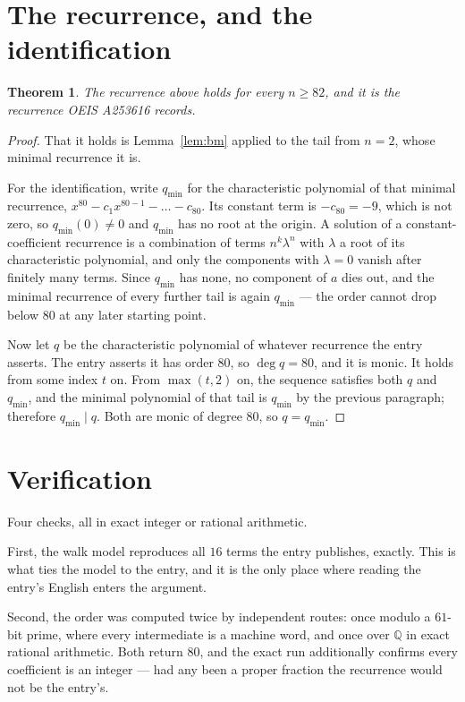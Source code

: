 \documentclass[11pt,a4paper]{article}
\theoremstyle{plain}
\newtheorem{theorem}{Theorem}
\theoremstyle{definition}
\begin{document}
\section{The recurrence, and the identification}

\begin{theorem}
The recurrence above holds for every $n\ge82$, and it is the recurrence OEIS A253616 records.
\end{theorem}

\begin{proof}
That it holds is Lemma~\ref{lem:bm} applied to the tail from $n=2$, whose minimal
recurrence it is.

For the identification, write $q_{\min}$ for the characteristic polynomial of that minimal
recurrence, $x^{80}-c_1x^{80-1}-\dots-c_{80}$. Its constant term is
$-c_{80}=-9$, which is not zero, so $q_{\min}(0)\neq0$ and $q_{\min}$ has no
root at the origin. A solution of a constant-coefficient recurrence is a combination of terms
$n^{k}\lambda^{n}$ with $\lambda$ a root of its characteristic polynomial, and only the
components with $\lambda=0$ vanish after finitely many terms. Since $q_{\min}$ has none, no
component of $a$ dies out, and the minimal recurrence of every further tail is again
$q_{\min}$ --- the order cannot drop below $80$ at any later starting point.

Now let $q$ be the characteristic polynomial of whatever recurrence the entry asserts. The
entry asserts it has order $80$, so $\deg q=80$, and it is monic. It holds from some
index $t$ on. From $\max(t,2)$ on, the sequence satisfies both $q$ and $q_{\min}$, and
the minimal polynomial of that tail is $q_{\min}$ by the previous paragraph; therefore
$q_{\min}\mid q$. Both are monic of degree $80$, so $q=q_{\min}$.
\end{proof}

\section{Verification}

Four checks, all in exact integer or rational arithmetic.

First, the walk model reproduces all $16$ terms the entry publishes, exactly. This is
what ties the model to the entry, and it is the only place where reading the entry's English
enters the argument.

Second, the order was computed twice by independent routes: once modulo a $61$-bit prime, where
every intermediate is a machine word, and once over $\mathbb{Q}$ in exact rational arithmetic.
Both return $80$, and the exact run additionally confirms every coefficient is an integer
--- had any been a proper fraction the recurrence would not be the entry's.
\end{document}
